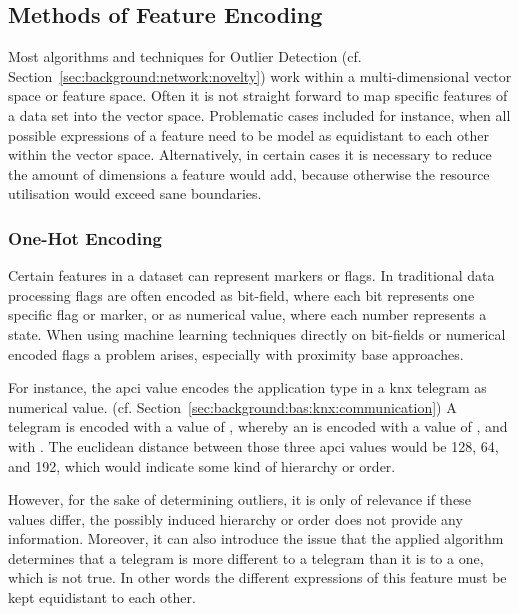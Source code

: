 
\subsection{Methods of Feature Encoding}
\label{sec:background:network:features}

Most algorithms and techniques for Outlier Detection (cf. Section~\ref{sec:background:network:novelty}) work within a multi-dimensional vector space or feature space. Often it is not straight forward to map specific features of a data set into the vector space.
Problematic cases included for instance, when all possible expressions of a feature need to be model as equidistant to each other within the vector space. 
Alternatively, in certain cases it is necessary to reduce the amount of dimensions a feature would add, because otherwise the resource utilisation would exceed sane boundaries.

\subsubsection{One-Hot Encoding}
\label{sec:background:network:features:onehot}

Certain features in a dataset can represent markers or flags. In traditional data processing flags are often encoded as bit-field, where each bit represents one specific flag or marker, or as numerical value, where each number represents a state.
When using machine learning techniques directly on bit-fields or numerical encoded flags a problem arises, especially with proximity base approaches.

For instance, the \gls{apci} value encodes the application type in a \gls{knx} telegram as numerical value. (cf. Section~\ref{sec:background:bas:knx:communication})
A  telegram is encoded with a value of , whereby an  is encoded with a value of , and  with .
The euclidean distance between those three \gls{apci} values would be 128, 64, and 192, which would indicate some kind of hierarchy or order.

However, for the sake of determining outliers, it is only of relevance if these values differ, the possibly induced hierarchy or order does not provide any information.
Moreover, it can also introduce the issue that the applied algorithm determines that a  telegram is more different to a  telegram than it is to a  one, which is not true.
In other words the different expressions of this feature must be kept equidistant to each other.

